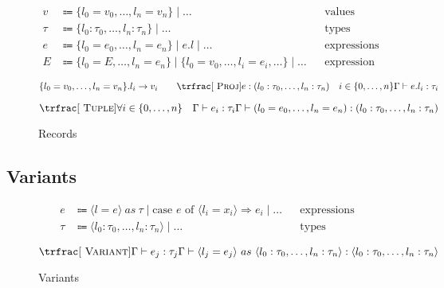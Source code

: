 \documentclass[nonacm]{acmart}
\begin{document}
\begin{figure}
  \begin{framed}
    \begin{align*}
      v    & \Coloneqq \{l_0 = v_0, \dots, l_n = v_n\} \mid \dots                                              &  & \text{values}             \\
      \tau & \Coloneqq \{l_0 : \tau_0, \dots, l_n : \tau_n \} \mid \dots                                       &  & \text{types}              \\
      e    & \Coloneqq \{l_0 = e_0, \dots, l_n = e_n\} \mid e.l \mid \dots                                     &  & \text{expressions}        \\
      E    & \Coloneqq  \{l_0 = E, \dots, l_n = e_n \} \mid \{l_0 = v_0, \dots, l_i = e_i, \dots \} \mid \dots &  & \text{expression context}
    \end{align*}

    \[
      \{l_0 = v_0, \dots, l_n = v_n\}.l_i \rightarrow v_i
      \qquad
      \trfrac[~\textsc{Proj}]{e : (l_0 : \tau_0, \dots, l_n : \tau_n) \quad i \in \{0, \dots, n\}}{\Gamma \vdash e.l_i : \tau_i}
    \]

    \[
      \trfrac[~\textsc{Tuple}]{\forall i \in \{0, \dots, n\} \quad \Gamma \vdash e_i : \tau_i}{\Gamma \vdash (l_0 = e_0, \dots, l_n = e_n) : (l_0 : \tau_0, \dots, l_n : \tau_n)}
    \]
  \end{framed}
  \caption{Records}\label{fig:records}
\end{figure}

\subsection{Variants}

\begin{figure}
  \begin{framed}
    \begin{align*}
      e & \Coloneqq \langle l = e \rangle~as~\tau \mid \text{case } e \text{ of } \langle l_i = x_i \rangle \Rightarrow e_i \mid \dots && \text{expressions} \\
      \tau & \Coloneqq \langle l_0 : \tau_0, \dots, l_n : \tau_n \rangle \mid \dots && \text{types} \\
    \end{align*}
    \[
      \trfrac[~\textsc{Variant}]{\Gamma \vdash e_j : \tau_j}{
        \Gamma \vdash \langle l_j = e_j \rangle~as~\langle l_0 : \tau_0, \dots, l_n : \tau_n \rangle : \langle l_0 : \tau_0, \dots, l_n : \tau_n \rangle
      }
    \]
  \end{framed}
  \caption{Variants}\label{fig:variants}
\end{figure}
\end{document}
